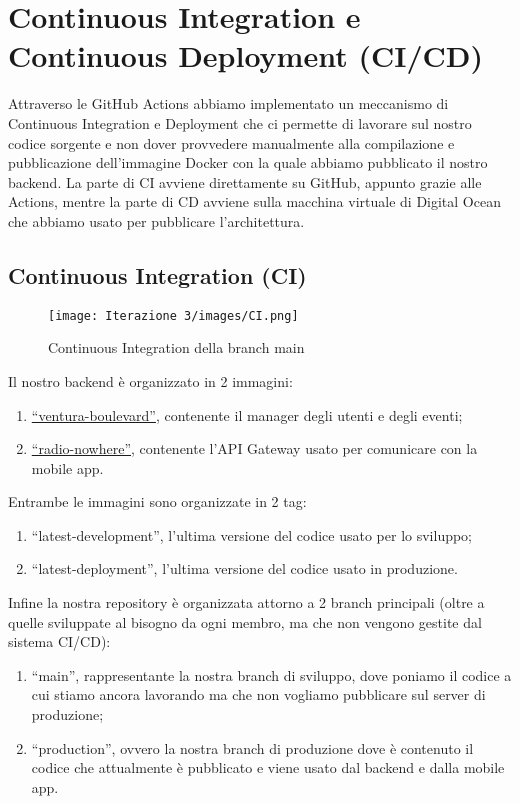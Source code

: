 \section{Continuous Integration e Continuous Deployment (CI/CD)}
\label{sect:CICD_it3}
Attraverso le GitHub Actions abbiamo implementato un meccanismo di Continuous Integration e Deployment che ci permette di lavorare sul nostro codice sorgente e non dover provvedere manualmente alla compilazione e pubblicazione dell'immagine Docker con la quale abbiamo pubblicato il nostro backend. La parte di CI avviene direttamente su GitHub, appunto grazie alle Actions, mentre la parte di CD avviene sulla macchina virtuale di Digital Ocean che abbiamo usato per pubblicare l'architettura.
\subsection{Continuous Integration (CI)}
\begin{figure}[h!]
  \centering
  \texttt{[image: Iterazione 3/images/CI.png]}
  \caption{Continuous Integration della branch main}
\end{figure}
Il nostro backend è organizzato in 2 immagini:
\begin{enumerate}
  \item \href{https://hub.docker.com/repository/docker/freddy153/ventura_boulevard/general}{``ventura-boulevard''}, contenente il manager degli utenti e degli eventi;
  \item \href{https://hub.docker.com/repository/docker/freddy153/radio_nowhere/general}{``radio-nowhere''}, contenente l'API Gateway usato per comunicare con la mobile app.
\end{enumerate}
Entrambe le immagini sono organizzate in 2 tag:
\begin{enumerate}
  \item ``latest-development'', l'ultima versione del codice usato per lo sviluppo;
  \item ``latest-deployment'', l'ultima versione del codice usato in produzione.
\end{enumerate}
Infine la nostra repository è organizzata attorno a 2 branch principali (oltre a quelle sviluppate al bisogno da ogni membro, ma che non vengono gestite dal sistema CI/CD):
\begin{enumerate}
  \item ``main'', rappresentante la nostra branch di sviluppo, dove poniamo il codice a cui stiamo ancora lavorando ma che non vogliamo pubblicare sul server di produzione;
  \item  ``production'', ovvero la nostra branch di produzione dove è contenuto il codice che attualmente è pubblicato e viene usato dal backend e dalla mobile app.
\end{enumerate}
